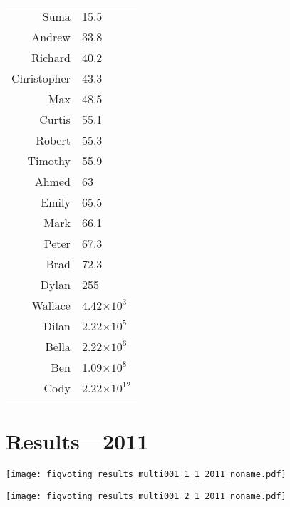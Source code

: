 \begin{frame}[plain]
\begin{frame}[plain]
\begin{frame}[plain]
\begin{frame}[plain]
\begin{frame}[plain]
\begin{frame}[plain]
\begin{frame}[plain]
\begin{frame}[plain]
\begin{frame}[plain]
\begin{frame}[plain]
\begin{frame}[plain]
\begin{frame}[plain]
\begin{frame}[plain]
\begin{frame}[plain]
\begin{frame}[plain]
\begin{frame}[plain]
\begin{frame}[plain]
\begin{frame}[plain]
\begin{frame}[plain]
  \begin{tabular}{rl}
    Suma & 15.5 \\ 
    Andrew & 33.8 \\ 
    Richard & 40.2 \\ 
    Christopher & 43.3 \\ 
    Max & 48.5 \\ 
    Curtis & 55.1 \\ 
    Robert & 55.3 \\ 
    Timothy & 55.9 \\ 
    Ahmed &   63 \\ 
    Emily & 65.5 \\ 
    Mark & 66.1 \\ 
    Peter & 67.3 \\ 
    Brad & 72.3 \\ 
    Dylan &  255 \\ 
    Wallace & 4.42$\times$$10^{3}$ \\ 
    Dilan & 2.22$\times$$10^{5}$ \\ 
    Bella & 2.22$\times$$10^{6}$ \\ 
    Ben & 1.09$\times$$10^{8}$ \\ 
    Cody & 2.22$\times$$10^{12}$ \\ 
  \end{tabular}




\section{Results---2011}


\begin{frame}[plain]
  

  \texttt{[image: figvoting\_results\_multi001\_1\_1\_2011\_noname.pdf]}\\


\begin{frame}[plain]
  

  \texttt{[image: figvoting\_results\_multi001\_2\_1\_2011\_noname.pdf]}\\


\begin{frame}[plain]
  


\end{frame}
\end{frame}
\end{frame}
\end{frame}
\end{frame}
\end{frame}
\end{frame}
\end{frame}
\end{frame}
\end{frame}
\end{frame}
\end{frame}
\end{frame}
\end{frame}
\end{frame}
\end{frame}
\end{frame}
\end{frame}
\end{frame}
\end{frame}
\end{frame}
\end{frame}
